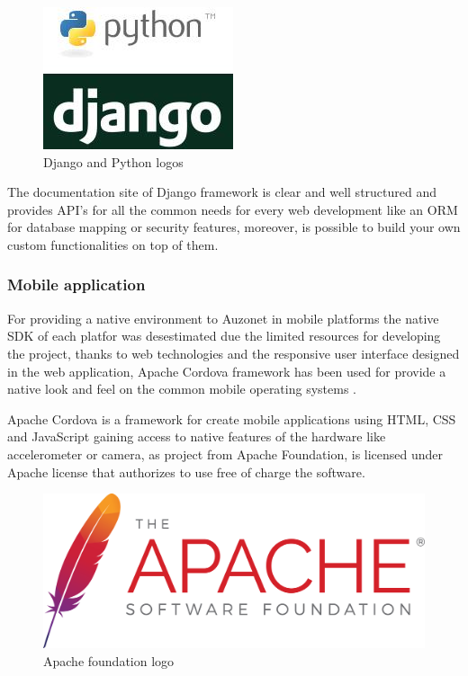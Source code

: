 \documentclass{DeustoFDP}
\begin{document}
\begin{figure}[h]
\centering
\includegraphics[width=0.5\linewidth]{fig/python-django}
\caption[Django and Python logos]{Django and Python logos}
\label{fig:python-django}
\end{figure}


The documentation site of Django framework \cite{Djangodocs} is clear and well structured and provides API's for all the common needs for every web development like an ORM for database mapping or security features, moreover, is possible to build your own custom functionalities on top of them.

\subsubsection{Mobile application}
For providing a native environment to Auzonet in mobile platforms the native SDK of each platfor was desestimated due the limited resources for developing the project, thanks to web technologies and the responsive user interface designed in the web application, Apache Cordova framework has been used for provide a native look and feel on the common mobile operating systems \cite{convertingwebapps}.

Apache Cordova is a framework for create mobile applications using HTML, CSS and JavaScript gaining access to native features of the hardware like accelerometer or camera, as project from Apache Foundation, is licensed under Apache license that authorizes to use free of charge the software.

\begin{figure}[h]
\centering
\includegraphics[width=0.4\linewidth]{fig/apache}
\caption[Apache foundation logo]{Apache foundation logo}
\label{fig:apache}
\end{figure}
\end{document}
